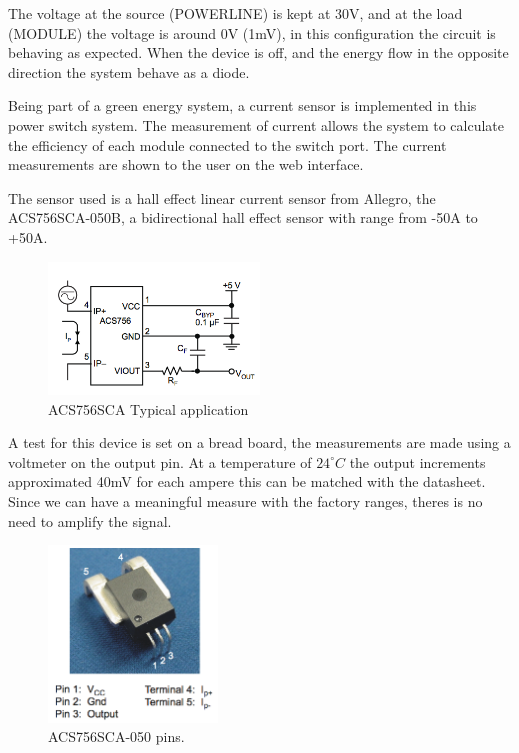 The voltage at the source (POWERLINE) is kept at 30V, and at the load (MODULE) the voltage is around 0V (1mV), in this configuration the circuit is behaving as expected. When the device is off, and the energy flow in the opposite direction the system behave as a diode.


Being part of a green energy system, a current sensor is implemented in this power switch system. The measurement of current allows the system to calculate the efficiency of each module connected to the switch port. The current measurements are shown to the user on the web interface.

The sensor used is a hall effect linear current sensor from Allegro, the ACS756SCA-050B, a bidirectional hall effect sensor with range from -50A to +50A.

\begin{figure}[H]
	\begin{centering}
		\includegraphics[width=0.5\textwidth]{images/current_sensor.png}
		\caption{ACS756SCA Typical application}
	\end{centering}
\end{figure}

A test for this device is set on a bread board, the measurements are made using a voltmeter on the output pin. At a temperature of $ 24^\circ C $ the output increments approximated 40mV for each ampere this can be matched with the datasheet. Since we can have a meaningful measure with the factory ranges, theres is no need to amplify the signal.

\begin{figure}[H]
	\begin{centering}
		\includegraphics[width=0.40\textwidth]{images/tb5_CS_photo.png}
		\caption{ACS756SCA-050 pins.}
	\end{centering}
\end{figure}

